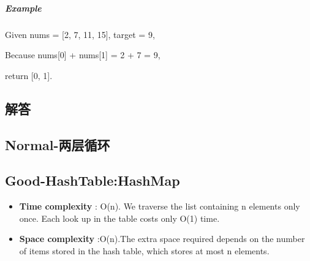 \documentclass[UTF8,a4paper,12pt]{ctexbook}
\begin{document}
		\subparagraph{Example}
		Given nums = [2, 7, 11, 15], target = 9,
		
		Because nums[0] + nums[1] = 2 + 7 = 9,
		
		return [0, 1].
	\subsection{解答}
	\subsection{Normal-两层循环}
	\subsection{Good-HashTable:HashMap}
	\begin{itemize}
		\item \textbf{Time complexity} : O(n). We traverse the list containing n elements only once. Each look up in the table costs only O(1) time.
		
		\item \textbf{Space complexity} :O(n).The extra space required depends on the number of items stored in the hash table, which stores at most n elements.
	\end{itemize}
\end{document}
